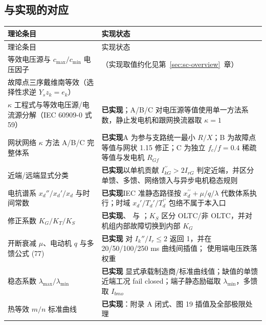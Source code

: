 \subsection{与实现的对应}
\begin{center}\footnotesize
\begin{longtable}{@{}L{6.8cm}L{8.6cm}@{}}
\toprule
理论条目 & 实现状态\\
\midrule
\endfirsthead
\toprule
理论条目 & 实现状态\\
\midrule
\endhead
等效电压源与 $c_{\max}/c_{\min}$ 电压因子 &
（实现取值约化见第~\ref{sec:sc-overview}~章）\\
故障点三序戴维南等效（选择性求逆 $Y_sz_k=e_k$） &
\\
$\kappa$ 工程式与等效电压源/电流源分解（IEC 60909-0 式 59） &
\textbf{已实现}\quad {}；A/B/C 对电压源等值使用单一方法系数，静止发电机和跟网换流器取 $\kappa=1$\\
网状网络 $\kappa$ 方法 A/B/C 完整体系 &
\textbf{已实现}\quad A 为参与支路统一最小 $R/X$；B 为故障点等值与网状 1.15 修正；C 为独立 $f_c/f=0.4$ 稀疏等值与发电机 $R_{Gf}$\\
近端/远端显式分类 &
\textbf{已实现}\quad 以单机贡献 $I_{kG}^{\prime\prime}>2I_{rG}$ 判定近端，并区分单馈、多馈、网络馈入与异步电机稳态规则\\
电抗谱系 $x_d''/x_d'/x_d$ 与时间常数 &
\textbf{已实现}\quad IEC 准静态路径按 $x_d^{\prime\prime}+\mu/q/\lambda$ 代数体系执行；时域 $x_d'/T_d'/T_d^{\prime\prime}$ 包络不属于本入口\\
修正系数 $K_G/K_T/K_S$ &
\textbf{已实现}\quad {}、 与 ；$K_S$ 区分 OLTC/非 OLTC，并对机组内部故障切换到内部 $K_G$\\
开断衰减 $\mu$、电动机 $q$ 与多馈公式 (77) &
\textbf{已实现}\quad {} 对 $I_k''/I_r\le2$ 返回 1，并在 20/50/100/250 ms 曲线间插值； 使用端电压跌落权重\\
稳态系数 $\lambda_{\max}/\lambda_{\min}$ &
\textbf{已实现}\quad {} 显式承载制造商/标准曲线值；缺值的单馈近端工况 fail closed；端子静态励磁取 $\lambda_{\min}$，多馈取 $I_{bmo}$\\
热等效 $m/n$ 标准曲线 &
\textbf{已实现}\quad {}：附录 A 闭式、图 19 插值及全部极限处理\\
\bottomrule
\end{longtable}
\end{center}

